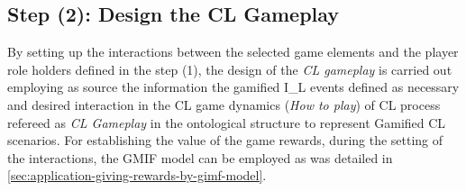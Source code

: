 

\subsection{Step (2): Design the CL Gameplay}

By setting up the interactions between the selected game elements and the player role holders defined in the step (1), the design of the \emph{CL gameplay} is carried out employing as source the information the gamified I\_L events defined as necessary and desired interaction in the CL game dynamics (\emph{How to play}) of CL process refereed as \emph{CL Gameplay} in the ontological structure to represent Gamified CL scenarios.
For establishing the value of the game rewards, during the setting of the interactions, the GMIF model can be employed as was detailed in \autoref{sec:application-giving-rewards-by-gimf-model}.

